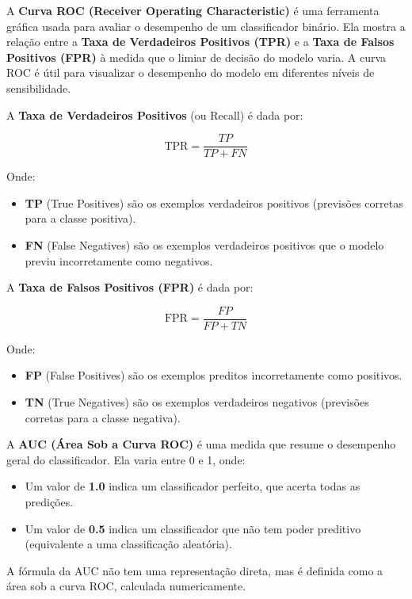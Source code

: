 \documentclass[conference]{IEEEtran}
\begin{document}
A \textbf{Curva ROC (Receiver Operating Characteristic)} é uma ferramenta gráfica usada para avaliar o desempenho de um classificador binário. Ela mostra a relação entre a \textbf{Taxa de Verdadeiros Positivos (TPR)} e a \textbf{Taxa de Falsos Positivos (FPR)} à medida que o limiar de decisão do modelo varia. A curva ROC é útil para visualizar o desempenho do modelo em diferentes níveis de sensibilidade.

A \textbf{Taxa de Verdadeiros Positivos} (ou Recall) é dada por:

\[
\text{TPR} = \frac{TP}{TP + FN}
\]

Onde:

\begin{itemize}
	\item \textbf{TP} (True Positives) são os exemplos verdadeiros positivos (previsões corretas para a classe positiva).
	\item \textbf{FN} (False Negatives) são os exemplos verdadeiros positivos que o modelo previu incorretamente como negativos.
\end{itemize}

A \textbf{Taxa de Falsos Positivos (FPR)} é dada por:

\[
\text{FPR} = \frac{FP}{FP + TN}
\]

Onde:

\begin{itemize}
	\item \textbf{FP} (False Positives) são os exemplos preditos incorretamente como positivos.
	\item \textbf{TN} (True Negatives) são os exemplos verdadeiros negativos (previsões corretas para a classe negativa).
\end{itemize}

A \textbf{AUC (Área Sob a Curva ROC)} é uma medida que resume o desempenho geral do classificador. Ela varia entre 0 e 1, onde:

\begin{itemize}
	\item Um valor de \textbf{1.0} indica um classificador perfeito, que acerta todas as predições.
	\item Um valor de \textbf{0.5} indica um classificador que não tem poder preditivo (equivalente a uma classificação aleatória).
\end{itemize}

A fórmula da AUC não tem uma representação direta, mas é definida como a área sob a curva ROC, calculada numericamente.
\end{document}
